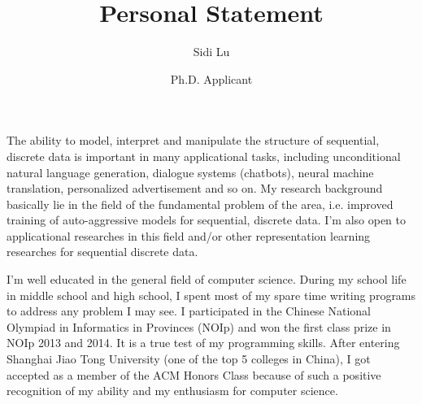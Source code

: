 \documentclass{article}
\title{Personal Statement}
\author{Sidi Lu}
\date{Ph.D. Applicant}
\begin{document}
      \maketitle%
      \thispagestyle{empty}
      \vspace{35pt}
    

      The ability to model, interpret and manipulate the structure of sequential, discrete data is important in many applicational tasks, including unconditional natural language generation, dialogue systems (chatbots), neural machine translation, personalized advertisement and so on. My research background basically lie in the field of the fundamental problem of the area, i.e. improved training of auto-aggressive models for sequential, discrete data. I'm also open to applicational researches in this field and/or other representation learning researches for sequential discrete data.

      I'm well educated in the general field of computer science. During my school life in middle school and high school, I spent most of my spare time writing programs to address any problem I may see. I participated in the Chinese National Olympiad in Informatics in Provinces (NOIp) and won the first class prize in NOIp 2013 and 2014. It is a true test of my programming skills. After entering Shanghai Jiao Tong University (one of the top 5 colleges in China), I got accepted as a member of the ACM Honors Class because of such a positive recognition of my ability and my enthusiasm for computer science. 
\end{document}
